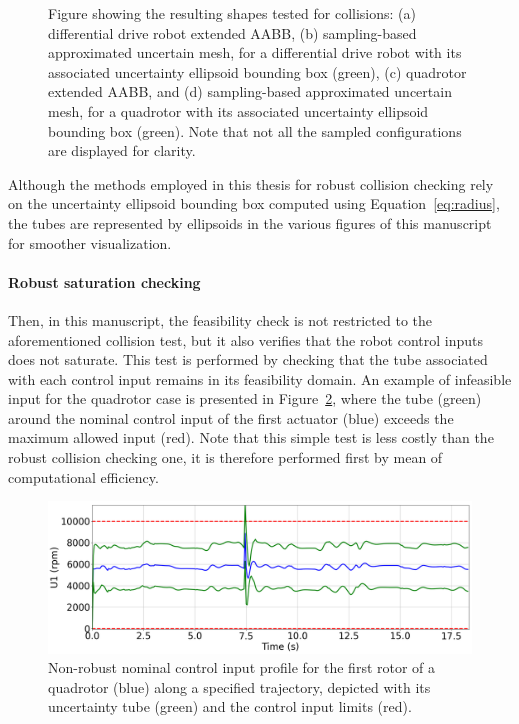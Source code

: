 \begin{figure}[htp]
    \caption{Figure showing the resulting shapes tested for collisions: (a) differential drive robot extended AABB, 
    (b) sampling-based approximated uncertain mesh, for a differential drive robot with its associated uncertainty ellipsoid bounding box (green), (c) quadrotor extended AABB, and (d)
    sampling-based approximated uncertain mesh, for a quadrotor with its associated uncertainty ellipsoid bounding box (green).
    Note that not all the sampled configurations are displayed for clarity.}
    \label{fig:CCmethods}
\end{figure}

Although the methods employed in this thesis for robust collision checking rely on the uncertainty ellipsoid bounding box computed using Equation~\ref{eq:radius}, the tubes are represented by ellipsoids in the various figures of this manuscript for smoother visualization.

\paragraph{Robust saturation checking}
Then, in this manuscript, the feasibility check is not restricted to the aforementioned collision test, but it also verifies that the robot control inputs does not saturate.
This test is performed by checking that the tube associated with each control input remains in its feasibility domain.
An example of infeasible input for the quadrotor case is presented in Figure~\ref{fig:invalid_inputs}, where the tube (green) around the nominal control input of the first actuator (blue) exceeds the maximum allowed input (red).
Note that this simple test is less costly than the robust collision checking one, it is therefore performed first by mean of computational efficiency. 

\begin{figure} [htp]
    \centering
    \includegraphics[width=0.8\linewidth]{figures/samp/Invalid_Inputs.png} 
    \caption{Non-robust nominal control input profile for the first rotor of a quadrotor (blue) along a specified trajectory, depicted with its uncertainty tube (green) and the control input limits (red).}%
    \label{fig:invalid_inputs}%
\end{figure}